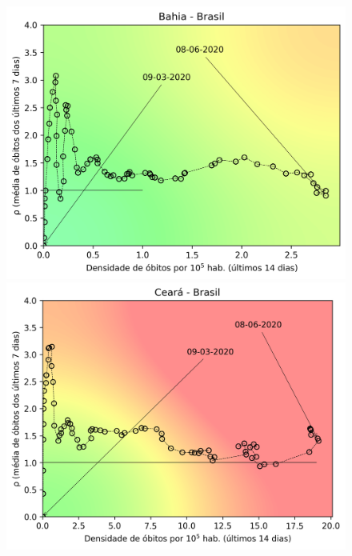 \documentclass[]{article}
\begin{document}
\begin{figure}[!h]
	\begin{minipage}[t]{4cm}
	\centering
	\includegraphics[scale=0.5]{../BA.png}
\end{minipage}
\hspace{5cm}
\begin{minipage}[t]{4cm}
	\centering
	\includegraphics[scale=0.5]{../CE.png}
	\vspace{0.2cm}
\end{minipage}


\end{figure}
\end{document}

